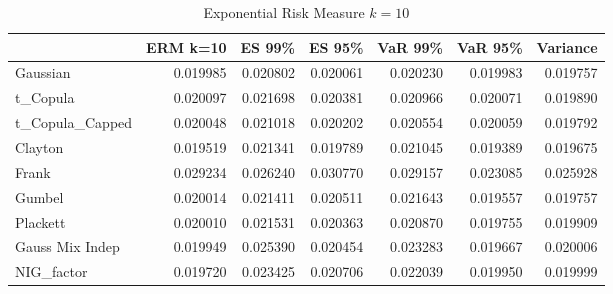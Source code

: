 \newpage
\begin{table}
    \centering
\begin{tabular}{lrrrrrr}
\toprule
{} &  ERM k=10 &    ES 99\% &    ES 95\% &   VaR 99\% &   VaR 95\% &  Variance \\
\midrule
Gaussian        &  0.019985 &  \color{green}0.020802 &  0.020061 &  \color{green}0.020230 &  0.019983 &  \color{blue}0.019757 \\
t\_Copula        &  0.020097 &  0.021698 &  0.020381 &  0.020966 &  0.020071 &  \color{blue}0.019890 \\
t\_Copula\_Capped &  0.020048 &  0.021018 &  0.020202 &  0.020554 &  0.020059 &  \color{blue}0.019792 \\
Clayton         &  \color{green}0.019519 &  0.021341 &  \color{green}0.019789 &  0.021045 &  \color{red}0.019389 &  \color{green}0.019675 \\
Frank           &  0.029234 &  0.026240 &  0.030770 &  0.029157 &  \color{blue}0.023085 &  0.025928 \\
Gumbel          &  0.020014 &  0.021411 &  0.020511 &  0.021643 &  \color{blue}0.019557 &  0.019757 \\
Plackett        &  0.020010 &  0.021531 &  0.020363 &  0.020870 &  \color{blue}0.019755 &  0.019909 \\
Gauss Mix Indep &  0.019949 &  0.025390 &  0.020454 &  0.023283 &  \color{blue}0.019667 &  0.020006 \\
NIG\_factor      &  \color{blue}0.019720 &  0.023425 &  0.020706 &  0.022039 &  0.019950 &  0.019999 \\
\bottomrule
\end{tabular}
\caption{Exponential Risk Measure $k=10$}
\end{table}

